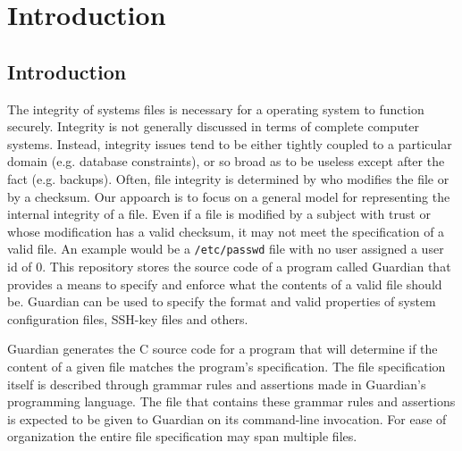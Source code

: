 
\chapter{Introduction}
{
	\section{Introduction}
	{
		The integrity of systems files is necessary for a operating system to
		function securely.  Integrity is not generally discussed in terms of
		complete computer systems. Instead, integrity issues tend to be either
		tightly coupled to a particular domain (e.g. database constraints), or
		so broad as to be useless except after the fact (e.g. backups).
		Often, file integrity is determined by who modifies the file or by a
		checksum. Our appoarch is to focus on a general model for representing
		the internal integrity of a file. Even if a file is modified by a
		subject with trust or whose modification has a valid checksum, it may
		not meet the specification of a valid file. An example would be a
		\texttt{/etc/passwd} file with no user assigned a user id of 0. This
		repository stores the source code of a program called Guardian that
		provides a means to specify and enforce what the contents of a valid
		file should be.
		Guardian can be used to specify the format and valid properties of
		system configuration files, SSH-key files and others.
		
		Guardian generates the C source code for a program that will determine
		if the content of a given file matches the program's specification.
		The file specification itself is
		described through grammar rules and assertions made in Guardian's
		programming language. The file that contains these grammar rules and
		assertions is expected to be given to Guardian on its command-line
		invocation.
		For ease of organization the entire file specification may span multiple
		files.
	}
}




















